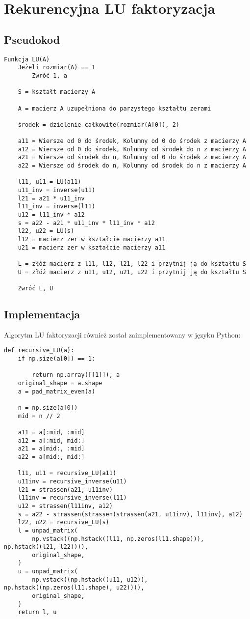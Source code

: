 \documentclass{article}
\begin{document}
\section{Rekurencyjna LU faktoryzacja}

\subsection{Pseudokod}

\begin{verbatim}
Funkcja LU(A)
    Jeżeli rozmiar(A) == 1
        Zwróć 1, a

    S = kształt macierzy A

    A = macierz A uzupełniona do parzystego kształtu zerami

    środek = dzielenie_całkowite(rozmiar(A[0]), 2) 
    
    a11 = Wiersze od 0 do środek, Kolumny od 0 do środek z macierzy A
    a12 = Wiersze od 0 do środek, Kolumny od środek do n z macierzy A
    a21 = Wiersze od środek do n, Kolumny od 0 do środek z macierzy A
    a22 = Wiersze od środek do n, Kolumny od środek do n z macierzy A
    
    l11, u11 = LU(a11)
    u11_inv = inverse(u11)
    l21 = a21 * u11_inv
    l11_inv = inverse(l11)
    u12 = l11_inv * a12
    s = a22 - a21 * u11_inv * l11_inv * a12
    l22, u22 = LU(s)
    l12 = macierz zer w kształcie macierzy a11
    u21 = macierz zer w kształcie macierzy a11

    L = złóż macierz z l11, l12, l21, l22 i przytnij ją do kształtu S
    U = złóż macierz z u11, u12, u21, u22 i przytnij ją do kształtu S
    
    Zwróć L, U
\end{verbatim}

\subsection{Implementacja}

Algorytm LU faktoryzacji również został zaimplementowany w języku Python:

\begin{verbatim}
def recursive_LU(a):
    if np.size(a[0]) == 1:

        return np.array([[1]]), a
    original_shape = a.shape
    a = pad_matrix_even(a)

    n = np.size(a[0])
    mid = n // 2

    a11 = a[:mid, :mid]
    a12 = a[:mid, mid:]
    a21 = a[mid:, :mid]
    a22 = a[mid:, mid:]

    l11, u11 = recursive_LU(a11)
    u11inv = recursive_inverse(u11)
    l21 = strassen(a21, u11inv)
    l11inv = recursive_inverse(l11)
    u12 = strassen(l11inv, a12)
    s = a22 - strassen(strassen(strassen(a21, u11inv), l11inv), a12)
    l22, u22 = recursive_LU(s)
    l = unpad_matrix(
        np.vstack((np.hstack((l11, np.zeros(l11.shape))), np.hstack((l21, l22)))),
        original_shape,
    )
    u = unpad_matrix(
        np.vstack((np.hstack((u11, u12)), np.hstack((np.zeros(l11.shape), u22)))),
        original_shape,
    )
    return l, u
\end{verbatim}
\end{document}
